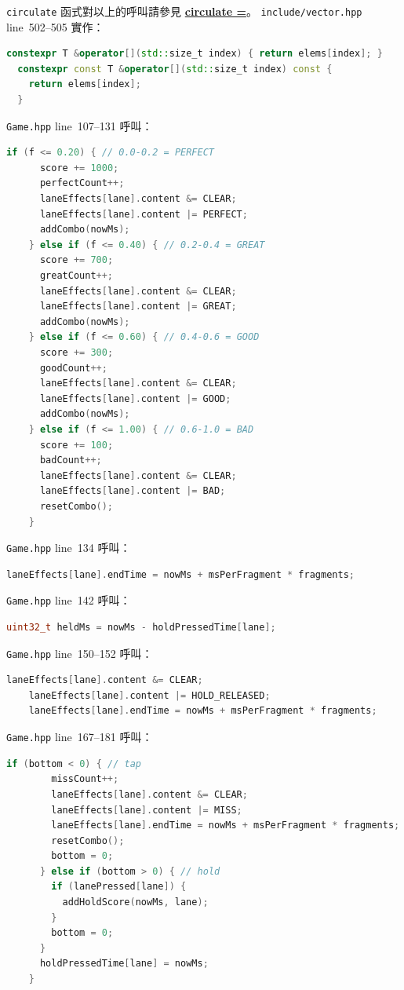 \documentclass[a4paper,12pt]{article}
\begin{document}
\verb|circulate| 函式對以上的呼叫請參見 \hyperref[circulate-equal]{\textbf{circulate =}}。
\verb|include/vector.hpp| line~502--505 實作：
\begin{lstlisting}[language=C++]
  constexpr T &operator[](std::size_t index) { return elems[index]; }
  constexpr const T &operator[](std::size_t index) const {
    return elems[index];
  }
\end{lstlisting}
\verb|Game.hpp| line~107--131 呼叫：
\begin{lstlisting}[language=C++]
    if (f <= 0.20) { // 0.0-0.2 = PERFECT
      score += 1000;
      perfectCount++;
      laneEffects[lane].content &= CLEAR;
      laneEffects[lane].content |= PERFECT;
      addCombo(nowMs);
    } else if (f <= 0.40) { // 0.2-0.4 = GREAT
      score += 700;
      greatCount++;
      laneEffects[lane].content &= CLEAR;
      laneEffects[lane].content |= GREAT;
      addCombo(nowMs);
    } else if (f <= 0.60) { // 0.4-0.6 = GOOD
      score += 300;
      goodCount++;
      laneEffects[lane].content &= CLEAR;
      laneEffects[lane].content |= GOOD;
      addCombo(nowMs);
    } else if (f <= 1.00) { // 0.6-1.0 = BAD
      score += 100;
      badCount++;
      laneEffects[lane].content &= CLEAR;
      laneEffects[lane].content |= BAD;
      resetCombo();
    }
\end{lstlisting}
\verb|Game.hpp| line~134 呼叫：
\begin{lstlisting}[language=C++]
    laneEffects[lane].endTime = nowMs + msPerFragment * fragments;
\end{lstlisting}
\verb|Game.hpp| line~142 呼叫：
\begin{lstlisting}[language=C++]
    uint32_t heldMs = nowMs - holdPressedTime[lane];
\end{lstlisting}
\verb|Game.hpp| line~150--152 呼叫：
\begin{lstlisting}[language=C++]
    laneEffects[lane].content &= CLEAR;
    laneEffects[lane].content |= HOLD_RELEASED;
    laneEffects[lane].endTime = nowMs + msPerFragment * fragments;
\end{lstlisting}
\verb|Game.hpp| line~167--181 呼叫：
\begin{lstlisting}[language=C++]
      if (bottom < 0) { // tap
        missCount++;
        laneEffects[lane].content &= CLEAR;
        laneEffects[lane].content |= MISS;
        laneEffects[lane].endTime = nowMs + msPerFragment * fragments;
        resetCombo();
        bottom = 0;
      } else if (bottom > 0) { // hold
        if (lanePressed[lane]) {
          addHoldScore(nowMs, lane);
        }
        bottom = 0;
      }
      holdPressedTime[lane] = nowMs;
    }
\end{lstlisting}
\end{document}
